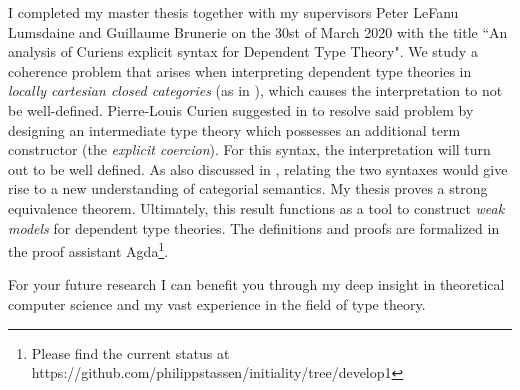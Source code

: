 \documentclass[10pt]{letter} %
\begin{document}
\begin{letter}{}
I completed my master thesis together with my supervisors Peter LeFanu Lumsdaine and Guillaume Brunerie on the 30st of March 2020 with the title ``An analysis of Curiens explicit syntax for Dependent Type Theory".
We study a coherence problem that arises when interpreting dependent type theories in \emph{locally cartesian closed categories} (as in \cite{seely}), which causes the interpretation to not be well-defined. 
Pierre-Louis Curien suggested in \cite{curien} to resolve said problem by designing an intermediate type theory which possesses an additional term constructor (the \emph{explicit coercion}). For this syntax, the interpretation will turn out to be well defined.
As also discussed in \cite{lumsdainehomotopy}, relating the two syntaxes would give rise to a new understanding of categorial semantics.
	My thesis proves a strong equivalence theorem. 
	Ultimately, this result functions as a tool to construct \emph{weak models} for dependent type theories. 
	The definitions and proofs are formalized in the proof assistant Agda\footnote{Please find the current status at https://github.com/philippstassen/initiality/tree/develop1}.

	For your future research I can benefit you through my deep insight in theoretical computer science and my vast experience in the field of type theory. 



\end{letter}
\end{document}
